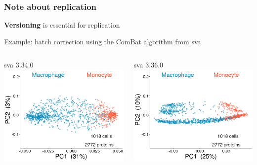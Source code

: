\documentclass{beamer}
\newcommand{\hcode}[2][lgray]{{\ttfamily\color{vdgray}\colorbox{#1}{#2}}}
\newcommand{\frametitlesection}[1]{\frametitle{\centering #1 \footnotesize \hspace{0pt plus 1 filll} \insertsection}}
\begin{document}
\begin{frame}
    \frametitlesection{Note about replication }

    \textbf{Versioning} is essential for replication

    Example: batch correction using the \hcode{ComBat} algorithm from \hcode{sva}

    \bigskip

    \scriptsize
    \centering
    \begin{columns}
        \begin{column}{0.5\textwidth}
            \hcode{sva 3.34.0}
            \includegraphics[width=\textwidth]{figs/CombatOld.png}
        \end{column}
        \begin{column}{0.5\textwidth}
            \hcode{sva 3.36.0}
            \includegraphics[width=\textwidth]{figs/CombatNew.png}
        \end{column}
    \end{columns}

\end{frame}
\end{document}
